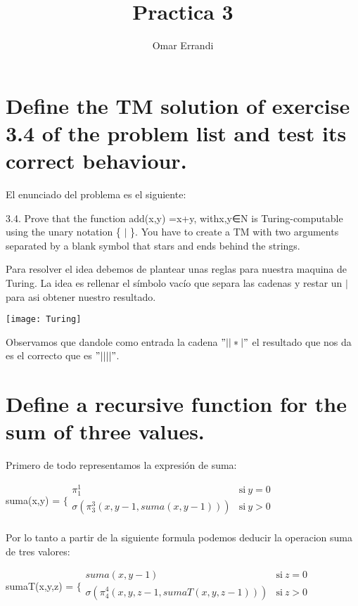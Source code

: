 \documentclass{article}
\title{\textbf{Practica 3}}
\author{Omar Errandi}
\date{}
\begin{document}
\maketitle

\section{Define the TM solution of exercise 3.4 of the problem list and test its correct
behaviour.}
El enunciado del problema es el siguiente:

3.4. Prove that the function add(x,y) =x+y, withx,y∈N is Turing-computable using the unary notation \{ $|$ \}.  You have to create a TM with two arguments separated by a blank symbol that stars and ends behind the strings.

Para resolver el idea debemos de plantear unas reglas para nuestra maquina de Turing. La idea es rellenar el símbolo vacío que separa las cadenas y restar un $|$ para asi obtener nuestro resultado.



\centering
	\texttt{[image: Turing]}
	\flushleft

Observamos que dandole como entrada la cadena $"||*|"$ el resultado que nos da es el correcto que es $"||||"$.

\section{Define a recursive function for the sum of three values.}
Primero de todo representamos la expresión de suma:

suma(x,y) = $\Biggl\{$$\begin{array}{ll}
		 \pi^1_{1}      & \mathrm{si\ } y = 0 \\
		 \sigma (\pi^3_{3}(x,y-1,suma({x,y-1}))) & \mathrm{si\ }  y> 0 \\
		 
	       \end{array}$
	       
	       
Por lo tanto a partir de la siguiente formula podemos deducir la operacion suma de tres valores:


sumaT(x,y,z) = $\Biggl\{$$\begin{array}{ll}
		 suma(x, y-1)      & \mathrm{si\ } z = 0 \\
		 \sigma (\pi^4_{4}(x,y,z-1,sumaT({x,y, z-1}))) & \mathrm{si\ }  z> 0 \\
		 
	       \end{array}$
	       
\end{document}
